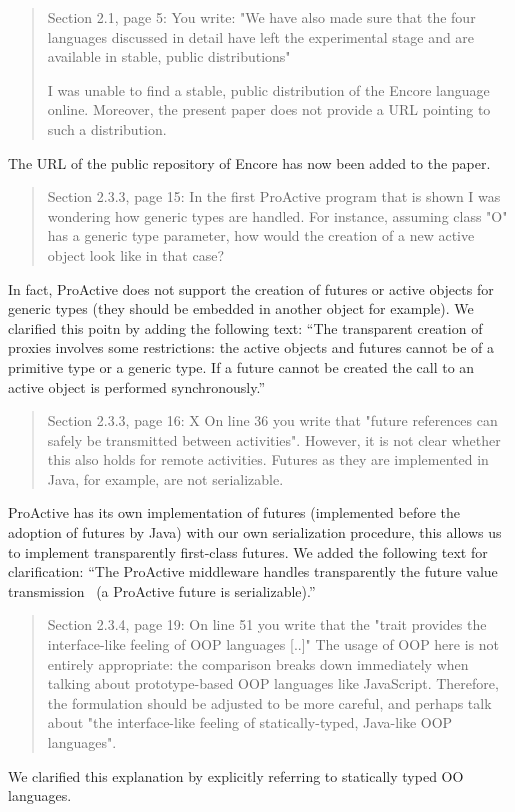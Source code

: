 \documentclass{article}
\begin{document}
\begin{quote}
	Section 2.1, page 5:
You write: "We have also made sure that the four languages discussed in detail have left 
the experimental stage and are available in stable, public distributions"

I was unable to find a stable, public distribution of the Encore language online. 
Moreover, the present paper does not provide a URL pointing to such a distribution.
\end{quote}
The URL of the public repository of Encore has now been added to the paper.

\begin{quote}
	Section 2.3.3, page 15:
In the first ProActive program that is shown I was wondering how generic types are 
handled. For instance, assuming class "O" has a generic type parameter, how would the 
creation of a new active object look like in that case?
\end{quote}
In fact, ProActive does not support the creation of futures or active objects for generic 
types (they should be embedded in another object for example). We clarified this poitn by 
adding the following text: ``The transparent creation of proxies 
involves some restrictions: the  active 
objects and futures cannot be of a primitive type or a generic type. If a future cannot 
be created the call to an active object is performed synchronously.''

\begin{quote}
	Section 2.3.3, page 16:
X On line 36 you write that "future references can safely be transmitted between 
activities". However, it is not clear whether this also holds for remote activities. 
Futures as they are implemented in Java, for example, are not serializable.
\end{quote}
ProActive has its own implementation of futures (implemented before the adoption of 
futures by Java) with our own serialization procedure, this allows us to implement 
transparently first-class futures. We added the following text for clarification:
``The ProActive middleware handles transparently the 
future value transmission~\cite{HKRZ:Coregrid:2010} (a ProActive future is 
serializable).''

\begin{quote}
	Section 2.3.4, page 19:
On line 51 you write that the "trait provides the interface-like feeling of OOP languages 
[..]" The usage of OOP here is not entirely appropriate: the comparison breaks down 
immediately when talking about prototype-based OOP languages like JavaScript. Therefore, 
the formulation should be adjusted to be more careful, and perhaps talk about "the 
interface-like feeling of statically-typed, Java-like OOP languages".
\end{quote}
We clarified this explanation by explicitly referring to statically typed OO languages.
\end{document}
